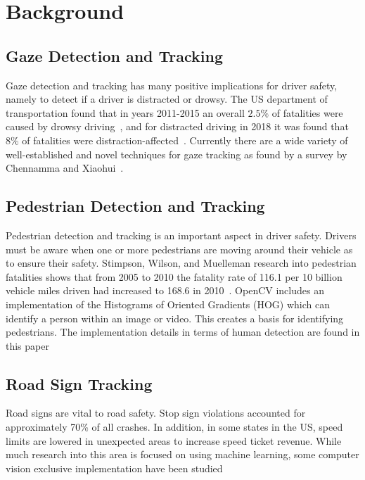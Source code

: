 \section{Background}
\subsection{Gaze Detection and Tracking}

Gaze detection and tracking has many positive implications for driver safety, namely to detect if a driver is distracted or drowsy. The US department of transportation found that in years 2011-2015 an overall $2.5\%$ of fatalities were caused by drowsy driving~\cite{CrashDrowsy}, and for distracted driving in 2018 it was found that $8\%$ of fatalities were distraction-affected~\cite{CrashDistracted}. Currently there are a wide variety of well-established and novel techniques for gaze tracking as found by a survey by Chennamma and Xiaohui~\cite{chennamma2013survey}. 

\subsection{Pedestrian Detection and Tracking}

Pedestrian detection and tracking is an important aspect in driver safety. Drivers must be aware when one or more pedestrians are moving around their vehicle as to ensure their safety. Stimpson, Wilson, and Muelleman research into pedestrian fatalities shows that from 2005 to 2010 the fatality rate of 116.1 per 10 billion vehicle miles driven had increased to 168.6 in 2010~\cite{PedestrianFatalities}.
OpenCV includes an implementation of the Histograms of Oriented Gradients (HOG) which can identify a person within an image or video. This creates a basis for identifying pedestrians.
The implementation details in terms of human detection are found in this paper\cite{HOGHumanDetection}

\subsection{Road Sign Tracking}
Road signs are vital to road safety. 
Stop sign violations accounted for approximately 70\% of all crashes. %
In addition, in some states in the US, speed limits are lowered in unexpected areas to increase speed ticket revenue. %
While much research into this area is focused on using machine learning, some computer vision exclusive implementation have been studied %